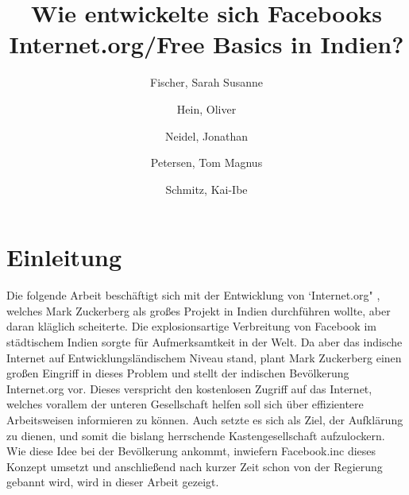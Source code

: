 \documentclass{article}
\title{Wie entwickelte sich Facebooks Internet.org/Free Basics in Indien?}
\author{
  Fischer, Sarah Susanne\\
  \and
  Hein, Oliver\\
  \and
  Neidel, Jonathan\\
  \and
  Petersen, Tom Magnus\\
  \and
  Schmitz, Kai-Ibe\\
}
\begin{document}
\maketitle
\section {Einleitung}
Die folgende Arbeit beschäftigt sich mit der Entwicklung von `Internet.org" , welches Mark Zuckerberg als großes Projekt in Indien durchführen wollte, aber daran kläglich scheiterte.
Die explosionsartige Verbreitung von Facebook im städtischem Indien sorgte für Aufmerksamtkeit in der Welt. Da aber das indische Internet auf Entwicklungsländischem Niveau stand, plant Mark Zuckerberg einen großen Eingriff in dieses Problem und stellt der indischen Bevölkerung Internet.org vor. Dieses verspricht den kostenlosen Zugriff auf das Internet, welches vorallem der unteren Gesellschaft helfen soll sich über effizientere Arbeitsweisen informieren zu können. Auch setzte es sich als Ziel, der Aufklärung zu dienen, und somit die bislang herrschende Kastengesellschaft aufzulockern.
Wie diese Idee bei der Bevölkerung ankommt, inwiefern Facebook.inc dieses Konzept umsetzt und anschließend nach kurzer Zeit schon von der Regierung gebannt wird, wird in dieser Arbeit gezeigt. 
\end{document}
